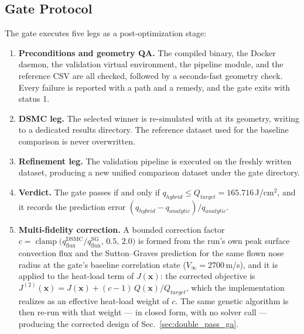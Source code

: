 \subsection{Gate Protocol}
The gate executes five legs as a post-optimization stage:
\begin{enumerate}
    \item \textbf{Preconditions and geometry QA.} The compiled binary, the Docker daemon, the validation virtual environment, the pipeline module, and the reference CSV are all checked, followed by a seconds-fast \texttt{} geometry check. Every failure is reported with a path and a remedy, and the gate exits with status 1.

    \item \textbf{DSMC leg.} The selected winner is re-simulated with \texttt{} at its geometry, writing to a dedicated results directory. The reference dataset used for the baseline comparison is never overwritten.

    \item \textbf{Refinement leg.} The validation pipeline is executed on the freshly written dataset, producing a new unified comparison dataset under the gate directory.

    \item \textbf{Verdict.} The gate passes if and only if $q_{hybrid} \leq Q_{target} = 165.716$\,J/cm$^2$, and it records the prediction error $(q_{hybrid} - q_{analytic})/q_{analytic}$.

    \item \textbf{Multi-fidelity correction.} A bounded correction factor $c = \operatorname{clamp}\bigl(q^{\mathrm{DSMC}}_{\mathrm{flux}}/\allowbreak q^{\mathrm{SG}}_{\mathrm{flux}},\,\allowbreak 0.5,\,\allowbreak 2.0\bigr)$ is formed from the run's own peak surface convection flux and the Sutton--Graves prediction for the same flown nose radius at the gate's baseline correlation state ($V_\infty = 2700$\,m/s), and it is applied to the heat-load term of $J(\mathbf{x})$: the corrected objective is $J^{(2)}(\mathbf{x}) = J(\mathbf{x}) + (c-1)\,Q(\mathbf{x})/Q_{target}$, which the implementation realizes as an effective heat-load weight of $c$. The same genetic algorithm is then re-run with that weight --- in closed form, with no solver call --- producing the corrected design of Sec.~\ref{sec:double_pass_ga}.
\end{enumerate}

